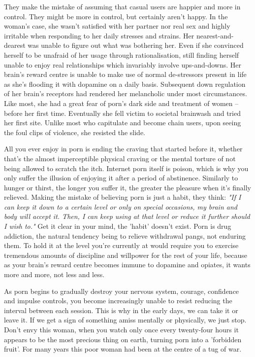 \documentclass[easypeasy]{subfiles}
\begin{document}
They make the mistake of assuming that casual users are happier and more in control. They might be more in control, but certainly aren't happy. In the woman's case, she wasn't satisfied with her partner nor real sex and highly irritable when responding to her daily stresses and strains. Her nearest-and-dearest was unable to figure out what was bothering her. Even if she convinced herself to be unafraid of her usage through rationalisation, still finding herself unable to enjoy real relationships which invariably involve ups-and-downs. Her brain's reward centre is unable to make use of normal de-stressors present in life as she's flooding it with dopamine on a daily basis. Subsequent down regulation of her brain's receptors had rendered her melancholic under most circumstances. Like most, she had a great fear of porn's dark side and treatment of women -- before her first time. Eventually she fell victim to societal brainwash and tried her first site. Unlike most who capitulate and become chain users, upon seeing the foul clips of violence, she resisted the slide.

All you ever enjoy in porn is ending the craving that started before it, whether that's the almost imperceptible physical craving or the mental torture of not being allowed to scratch the itch. Internet porn itself is poison, which is why you only suffer the illusion of enjoying it after a period of abstinence. Similarly to hunger or thirst, the longer you suffer it, the greater the pleasure when it's finally relieved. Making the mistake of believing porn is just a habit, they think: \textit{"If I can keep it down to a certain level or only on special occasions, my brain and body will accept it. Then, I can keep using at that level or reduce it further should I wish to."} Get it clear in your mind, the 'habit' doesn't exist. Porn is drug addiction, the natural tendency being to relieve withdrawal pangs, not enduring them. To hold it at the level you're currently at would require you to exercise tremendous amounts of discipline and willpower for the rest of your life, because as your brain's reward centre becomes immune to dopamine and opiates, it wants more and more, not less and less. 

As porn begins to gradually destroy your nervous system, courage, confidence and impulse controls, you become increasingly unable to resist reducing the interval between each session. This is why in the early days, we can take it or leave it. If we get a sign of something amiss mentally or physically, we just stop. Don't envy this woman, when you watch only once every twenty-four hours it appears to be the most precious thing on earth, turning porn into a 'forbidden fruit'. For many years this poor woman had been at the centre of a tug of war.
\end{document}
